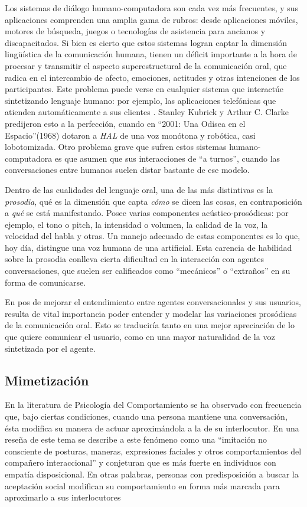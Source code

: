 
Los sistemas de diálogo humano-computadora son cada vez más frecuentes, y sus aplicaciones comprenden una amplia gama de rubros: desde aplicaciones móviles, motores de búsqueda, juegos o tecnologías de asistencia para ancianos y discapacitados. Si bien es cierto que estos sistemas logran captar la dimensión lingüística de la comunicación humana, tienen un déficit importante a la hora de procesar y transmitir el aspecto superestructural de la comunicación oral, que radica en el intercambio de afecto, emociones, actitudes y otras intenciones de los participantes. Este problema puede verse en cualquier sistema que interactúe sintetizando lenguaje humano: por ejemplo, las aplicaciones telefónicas que atienden automáticamente a sus clientes \cite{pieraccini2005,raux2006}. Stanley Kubrick y Arthur C. Clarke predijeron esto a la perfección, cuando en ``2001: Una Odisea en el Espacio''(1968) dotaron a \emph{HAL} de una voz monótona y robótica, casi lobotomizada. Otro problema grave que sufren estos sistemas humano-computadora es que asumen que sus interacciones de ``a turnos'', cuando las conversaciones entre humanos suelen distar bastante de ese modelo.

Dentro de las cualidades del lenguaje oral, una de las más distintivas es la \emph{prosodia}, qué es la dimensión que capta \emph{cómo} se dicen las cosas, en contraposición a \emph{qué} se está manifestando. Posee varias componentes acústico-prosódicas: por ejemplo, el tono o pitch, la intensidad o volumen, la calidad de la voz, la velocidad del habla y otras. Un manejo adecuado de estas componentes es lo que, hoy día, distingue una voz humana de una artificial. Esta carencia de habilidad sobre la prosodia conlleva cierta dificultad en la interacción con agentes conversaciones, que suelen ser calificados como ``mecánicos'' o ``extraños'' en su forma de comunicarse. \cite{raux2006,ward2005}

En pos de mejorar el entendimiento entre agentes conversacionales y sus usuarios, resulta de vital importancia poder entender y modelar las variaciones prosódicas de la comunicación oral. Esto se traduciría tanto en una mejor apreciación de lo que quiere comunicar el usuario, como en una mayor naturalidad de la voz sintetizada por el agente.

\subsection{Mimetización}

En la literatura de Psicología del Comportamiento se ha observado con frecuencia que, bajo ciertas condiciones, cuando una persona mantiene una conversación, ésta modifica su manera de actuar aproximándola a la de su interlocutor. En una reseña de este tema se describe a este fenómeno como una ``imitación no consciente de posturas, maneras, expresiones faciales y otros comportamientos del compañero interaccional'' \cite[p. 893]{CHAR1999}  y conjeturan que es más fuerte en individuos con empatía disposicional. En otras palabras, personas con predisposición a buscar la aceptación social modifican su comportamiento en forma más marcada para aproximarlo a sus interlocutores


